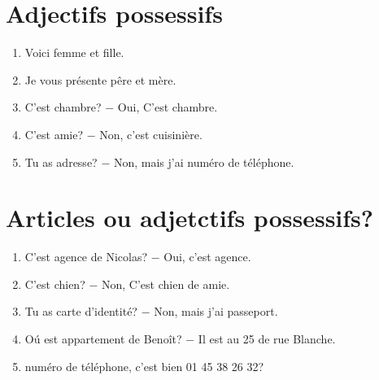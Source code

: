 \section{Adjectifs possessifs}

\begin{enumerate}
    \item Voici  femme et  fille.
    \item Je vous présente  pêre et  mère.
    \item C'est  chambre? $-$ Oui, C'est  chambre.
    \item C'est  amie? $-$ Non, c'est  cuisinière.
    \item Tu as  adresse? $-$ Non, mais j'ai  numéro de téléphone.
\end{enumerate}

\section{Articles ou adjetctifs possessifs?}

\begin{enumerate}
    \item C'est agence de Nicolas? $-$ Oui, c'est  agence.
    \item C'est  chien? $-$ Non, C'est  chien de  amie.
    \item Tu as   carte d'identité? $-$ Non, mais j'ai  passeport.
    \item Oú est appartement de Benoît? $-$ Il est au 25 de  rue Blanche.
    \item {} numéro de téléphone, c'est bien  01 45 38 26 32?
\end{enumerate}